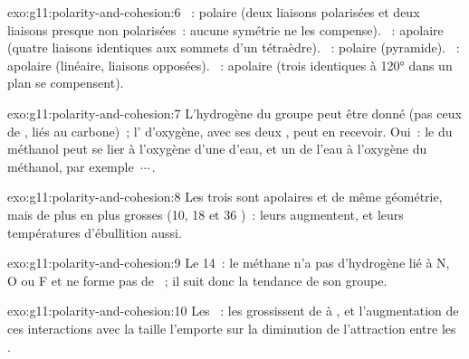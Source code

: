 \begin{solution}{exo:g11:polarity-and-cohesion:6}
~: polaire (deux liaisons  polarisées et deux
liaisons  presque non polarisées~: aucune symétrie ne les
compense). ~: apolaire (quatre liaisons identiques aux sommets
d'un tétraèdre). ~: polaire (pyramide). ~: apolaire
(linéaire, liaisons opposées). ~: apolaire (trois  identiques à \ang{120} dans un plan se compensent).
\end{solution}

\begin{solution}{exo:g11:polarity-and-cohesion:7}
L'hydrogène du groupe  peut être donné (pas ceux de ,
liés au carbone)~; l' d'oxygène, avec ses deux ,
peut en recevoir. Oui~: le  du méthanol peut se lier à
l'oxygène d'une  d'eau, et un  de l'eau à l'oxygène du
méthanol, par exemple \,$\cdots$\,.
\end{solution}

\begin{solution}{exo:g11:polarity-and-cohesion:8}
Les trois  sont apolaires et de même géométrie, mais de plus
en plus grosses (10, 18 et 36 )~: leurs  augmentent, et leurs températures d'ébullition aussi.
\end{solution}

\begin{solution}{exo:g11:polarity-and-cohesion:9}
Le  14~: le méthane n'a pas d'hydrogène lié à N, O ou F et ne
forme pas de ~; il suit donc la tendance de son
groupe.
\end{solution}

\begin{solution}{exo:g11:polarity-and-cohesion:10}
Les ~: les  grossissent de
 à , et l'augmentation de ces interactions avec la taille
l'emporte sur la diminution de l'attraction entre les .
\end{solution}


